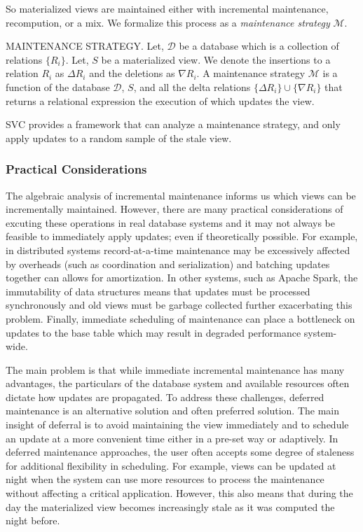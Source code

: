 So materialized views are maintained either with incremental maintenance, recompution, or a mix.
We formalize this process as a \emph{maintenance strategy} $\mathcal{M}$.
\begin{definition} MAINTENANCE STRATEGY.
Let, $\mathcal{D}$ be a database which is a collection of relations $\{R_i\}$.
Let, $S$ be a materialized view.
We denote the insertions to a relation $R_i$ as $\Delta R_i$ and the deletions as $\nabla R_i$.
A maintenance strategy $\mathcal{M}$ is a function of the database $\mathcal{D}$, $S$, and all the delta relations $\{\Delta R_i\} \cup \{\nabla R_i\}$ that returns a relational expression the execution of which updates the view.
\end{definition}

SVC provides a framework that can analyze a maintenance strategy, and only apply updates to a random sample of the stale view.

\subsubsection{Practical Considerations}
The algebraic analysis of incremental maintenance \cite{DBLP:journals/vldb/KochAKNNLS14, DBLP:conf/pods/Koch10} informs us which views can be incrementally maintained.
However, there are many practical considerations of excuting these operations in real database systems and it may not always be feasible to immediately apply updates; even if theoretically possible.
For example, in distributed systems record-at-a-time maintenance may be excessively affected by overheads (such as coordination and serialization) and batching updates together can allows for amortization.
In other systems, such as Apache Spark, the immutability of data structures means that updates must be processed synchronously and old views must be garbage collected further exacerbating this problem.
Finally, immediate scheduling of maintenance can place a bottleneck on updates to the base table which may result in degraded performance system-wide.

The main problem is that while immediate incremental maintenance has many advantages, the particulars of the database system and available resources often dictate how updates are propagated.
To address these challenges, deferred maintenance is an alternative solution and often preferred solution.
The main insight of deferral is to avoid maintaining the view immediately and to schedule an update at a more convenient time either in a pre-set way or adaptively.
In deferred maintenance approaches, the user often accepts some degree of staleness for additional flexibility in scheduling.
For example, views can be updated at night when the system can use more resources to process the maintenance without affecting a critical application.
However, this also means that during the day the materialized view becomes increasingly stale as it was computed the night before.

